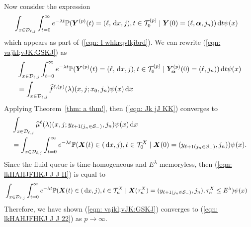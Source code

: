 Now consider the expression 
\begin{align}
	&\int_{x\in\mathcal{D}_{\ell,j}} \int_{t=0}^\infty e^{-\lambda t} \mathbb P({\boldsymbol Y}^{(p)}(t) = (\ell,\, \mathrm{d} x, j),  
	t\in\mathcal T_0^{(p)} \mid \boldsymbol Y(0) = (\ell,\boldsymbol\alpha, j_n)
	 	 )\, \mathrm{d} t  \psi(x)  \label{eqn: vajkl;vJK:GSKJ}
\end{align}
which appears as part of (\ref{eqn: l whkrqvlkjbrd}). We can rewrite (\ref{eqn: vajkl;vJK:GSKJ}) as  
\begin{align}
	 &\int_{x\in\mathcal{D}_{\ell,j}} \int_{t=0}^\infty e^{-\lambda t} \mathbb P({\boldsymbol Y}^{(p)}(t) = (\ell,\, \mathrm{d} x,j), 
	t\in\mathcal T_0^{(p)}\mid \bm{Y}_{\bm{\alpha}}^{(p)}(0) = (\ell,j_n))\, \mathrm{d} t \psi(x) \nonumber 
	 \\&= \int_{x\in\mathcal{D}_{\ell,j}} \widehat f^{\ell,(p)} (\lambda)(x,j;x_0,j_n) \psi(x)\, \mathrm{d} x \label{eqn: Jk jJ KK}
\end{align}
Applying Theorem~\ref{thm: a thm!}, then (\ref{eqn: Jk jJ KK}) converges to 
\begin{align}
	&\int_{x\in\mathcal{D}_{\ell,j}} \widehat \mu^{\ell} (\lambda)(x,j;y_{\ell+1(j_n\in\mathcal S_-)},j_n) \psi(x)\, \mathrm{d} x \nonumber 
	\\&= \int_{x\in\mathcal{D}_{\ell,j}} \int_{t=0}^\infty e^{-\lambda t}\mathbb P(\boldsymbol X(t)\in(\, \mathrm{d} x, j), t\in\mathcal T_0^X \mid \boldsymbol X(0) = (y_{\ell+1(j_n\in\mathcal S_-)}, j_n) ) \psi(x). \label{eqn: lkHAHJFHKJ J J H}
\end{align}
Since the fluid queue is time-homogeneous and \(E^\lambda\) memoryless, then (\ref{eqn: lkHAHJFHKJ J J H}) is equal to 
\begin{align}
	&\int_{x\in\mathcal{D}_{\ell,j}} \int_{t=0}^\infty e^{-\lambda t} \mathbb P(\boldsymbol X(t)\in(\, \mathrm{d} x,j), t\in\mathcal T_n^{X} \mid  
	\boldsymbol X(\tau_n^X) = (y_{\ell+1(j_n\in\mathcal S_-)},j_n), \tau_n^X\leq E^\lambda ) \psi(x)  \label{eqn: lkHAHJFHKJ J J 22}
\end{align}
Therefore, we have shown (\ref{eqn: vajkl;vJK:GSKJ}) converges to (\ref{eqn: lkHAHJFHKJ J J 22}) as \(p\to\infty\). 

